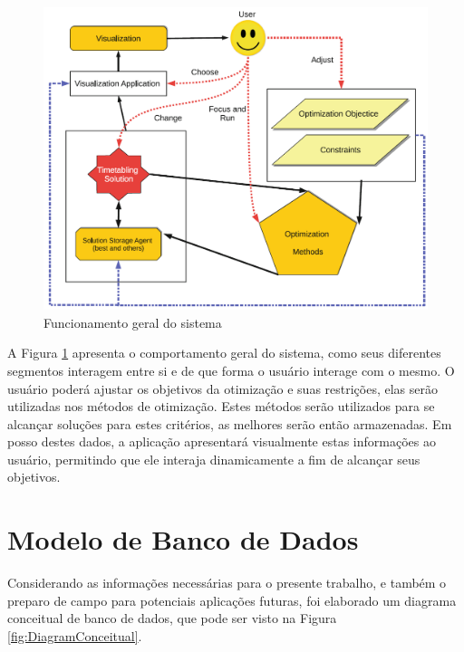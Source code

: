 \begin{figure}[htbp]\centering
  \caption{\label{fig:sistema} Funcionamento geral do sistema}
  \includegraphics[scale=0.6]{files/img/Arquitetura/Arquitetura_bebis_information_2019.png}
\end{figure}

A Figura \ref{fig:sistema} apresenta o comportamento geral do sistema, como seus diferentes segmentos interagem entre si e de que forma o usuário interage com o mesmo. O usuário poderá ajustar os objetivos da otimização e suas restrições, elas serão utilizadas nos métodos de otimização. Estes métodos serão utilizados para se alcançar soluções para estes critérios, as melhores serão então armazenadas. Em posso destes dados, a aplicação apresentará visualmente estas informações ao usuário, permitindo que ele interaja dinamicamente a fim de alcançar seus objetivos.

\section{Modelo de Banco de Dados} \label{ModelagemBD} %

Considerando as informações necessárias para o presente trabalho, e também o preparo de campo para potenciais aplicações futuras, foi elaborado um diagrama conceitual de banco de dados, que pode ser visto na Figura \ref{fig:DiagramConceitual}.

